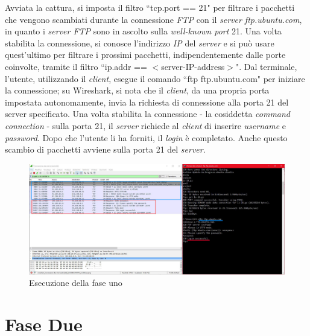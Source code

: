 \documentclass[a4paper, 12pt]{report}
\begin{document}
Avviata la cattura, si imposta il filtro ``tcp.port == 21" per filtrare i pacchetti che vengono scambiati durante la connessione \textit{FTP} con il \textit{server ftp.ubuntu.com}, in quanto i 
\textit{server FTP} sono in ascolto sulla \textit{well-known port} 21. Una volta stabilita la connessione, si conosce l’indirizzo \textit{IP} del \textit{server} e si può usare quest’ultimo per
filtrare i prossimi pacchetti, indipendentemente dalle porte coinvolte, tramite il filtro ``ip.addr == $<$server-IP-address$>$". Dal terminale, l'utente, utilizzando il \textit{client}, esegue il
comando ``ftp ftp.ubuntu.com" per iniziare la connessione; su Wireshark, si nota che il \textit{client}, da una propria porta impostata autonomamente, invia la richiesta di connessione alla porta
21 del server specificato. Una volta stabilita la connessione - la cosiddetta \textit{command connection} - sulla porta 21, il \textit{server} richiede al \textit{client} di inserire \textit{username}
e \textit{password}. Dopo che l'utente li ha forniti, il \textit{login} è completato. Anche questo scambio di pacchetti avviene sulla porta 21 del \textit{server}.

\begin{figure}[H]
	\centering
	\includegraphics[width=\linewidth]{images/image1_2.png}
	\caption{Esecuzione della fase uno}
\end{figure}

\section{Fase Due}
\end{document}
